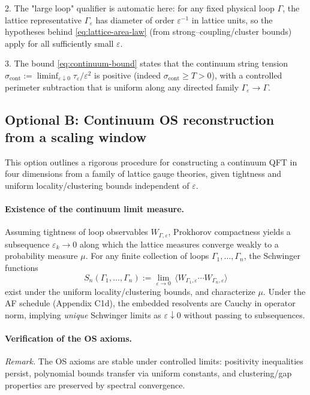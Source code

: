 \documentclass[11pt]{amsart}
\begin{document}
2. The "large loop" qualifier is automatic here: for any fixed physical loop $\Gamma$, the lattice representative $\Gamma_\varepsilon$ has diameter of order $\varepsilon^{-1}$ in lattice units, so the hypotheses behind \eqref{eq:lattice-area-law} (from strong--coupling/cluster bounds) apply for all sufficiently small $\varepsilon$.

3. The bound \eqref{eq:continuum-bound} states that the continuum string tension $\sigma_{\text{cont}}:=\liminf_{\varepsilon\downarrow 0}\tau_\varepsilon/\varepsilon^2$ is positive (indeed $\sigma_{\text{cont}}\ge T>0$), with a controlled perimeter subtraction that is uniform along any directed family $\Gamma_\varepsilon\to\Gamma$.

\subsection*{Optional B: Continuum OS reconstruction from a scaling window}

This option outlines a rigorous procedure for constructing a continuum QFT in four dimensions from a family of lattice gauge theories, given tightness and uniform locality/clustering bounds independent of $\varepsilon$.

\paragraph{Existence of the continuum limit measure.}
Assuming tightness of loop observables $W_{\Gamma,\varepsilon}$, Prokhorov compactness yields a subsequence $\varepsilon_k\to 0$ along which the lattice measures converge weakly to a probability measure $\mu$. For any finite collection of loops $\Gamma_1,\dots,\Gamma_n$, the Schwinger functions
\[
  S_n(\Gamma_1,\dots,\Gamma_n):=\lim_{\varepsilon\to 0}\,\langle W_{\Gamma_1,\varepsilon}\cdots W_{\Gamma_n,\varepsilon}\rangle
\]
exist under the uniform locality/clustering bounds, and characterize $\mu$.
Under the AF schedule (Appendix C1d), the embedded resolvents are Cauchy in operator norm, implying \emph{unique} Schwinger limits as $\varepsilon\downarrow 0$ without passing to subsequences.

\paragraph{Verification of the OS axioms.}
\emph{Remark.} The OS axioms are stable under controlled limits: positivity inequalities persist, polynomial bounds transfer via uniform constants, and clustering/gap properties are preserved by spectral convergence.
\end{document}
